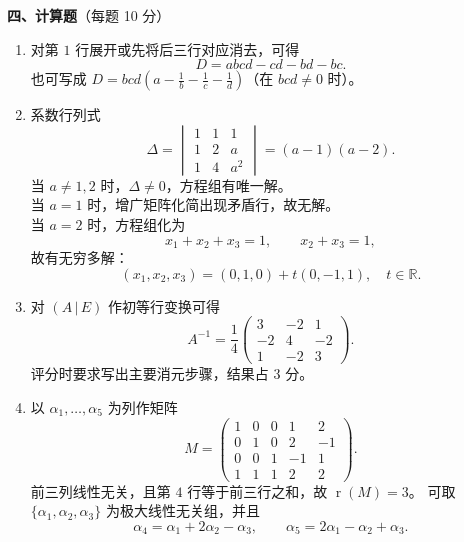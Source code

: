 \documentclass[12pt]{ctexart}
\newcommand{\rnk}{\operatorname{r}}
\begin{document}
\vspace{6pt}
\noindent\textbf{四、计算题}（每题 10 分）
\begin{enumerate}[label=\textbf{\arabic*.},itemsep=11pt]
\item 对第 $1$ 行展开或先将后三行对应消去，可得
  \[
  D=abcd-cd-bd-bc.
  \]
  也可写成 $D=bcd\left(a-\frac1b-\frac1c-\frac1d\right)$（在 $bcd\neq0$ 时）。

\item 系数行列式
  \[
  \Delta=\begin{vmatrix}1&1&1\\1&2&a\\1&4&a^2\end{vmatrix}
  =(a-1)(a-2).
  \]
  当 $a\neq1,2$ 时，$\Delta\neq0$，方程组有唯一解。\\
  当 $a=1$ 时，增广矩阵化简出现矛盾行，故无解。\\
  当 $a=2$ 时，方程组化为
  \[
  x_1+x_2+x_3=1,\qquad x_2+x_3=1,
  \]
  故有无穷多解：
  \[
  (x_1,x_2,x_3)=(0,1,0)+t(0,-1,1),\quad t\in\mathbb{R}.
  \]

\item 对 $(A\,|\,E)$ 作初等行变换可得
  \[
  A^{-1}=\frac14
  \begin{pmatrix}
  3&-2&1\\
  -2&4&-2\\
  1&-2&3
  \end{pmatrix}.
  \]
  评分时要求写出主要消元步骤，结果占 $3$ 分。

\item 以 $\alpha_1,\dots,\alpha_5$ 为列作矩阵
  \[
  M=\begin{pmatrix}
  1&0&0&1&2\\
  0&1&0&2&-1\\
  0&0&1&-1&1\\
  1&1&1&2&2
  \end{pmatrix}.
  \]
  前三列线性无关，且第 $4$ 行等于前三行之和，故 $\rnk(M)=3$。
  可取 $\{\alpha_1,\alpha_2,\alpha_3\}$ 为极大线性无关组，并且
  \[
  \alpha_4=\alpha_1+2\alpha_2-\alpha_3,\qquad
  \alpha_5=2\alpha_1-\alpha_2+\alpha_3.
  \]
\end{enumerate}
\end{document}
